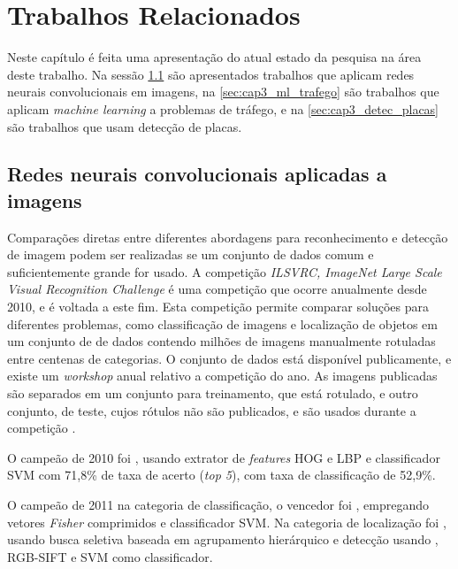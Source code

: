 
\chapter{Trabalhos Relacionados}

Neste capítulo é feita uma apresentação do atual estado da pesquisa na área
deste trabalho. Na sessão \ref{sec:cap3_img} são apresentados trabalhos que
aplicam redes neurais convolucionais em imagens, na \ref{sec:cap3_ml_trafego} 
são trabalhos que aplicam \emph{machine learning} a problemas de tráfego, e na
\ref{sec:cap3_detec_placas} são trabalhos que usam detecção de placas.

\section{Redes neurais convolucionais aplicadas a imagens} \label{sec:cap3_img}

Comparações diretas entre diferentes abordagens para reconhecimento e detecção de
imagem podem ser realizadas se um conjunto de dados comum e suficientemente
grande for usado. A competição \emph{ILSVRC, ImageNet Large Scale Visual
Recognition Challenge} é uma competição que ocorre anualmente desde 2010, e é
voltada a este fim. Esta competição permite comparar soluções 
para diferentes problemas, como classificação de imagens e localização de
objetos em um conjunto de
de dados contendo milhões de imagens manualmente rotuladas entre centenas de
categorias. O conjunto de dados está disponível publicamente, e existe um
\emph{workshop} anual relativo a competição do ano. As imagens publicadas são
separados em um conjunto para treinamento, que está rotulado, e outro
conjunto, de
teste, cujos rótulos não são publicados, e são usados durante a competição
 \cite{ILSVRC15}.

O campeão de 2010 foi , usando extrator de
\emph{features} HOG e LBP e classificador SVM com 71,8\% de taxa de
acerto (\emph{top 5}), com taxa de classificação de 52,9\%.

O campeão de 2011 na categoria de classificação, o vencedor foi
, empregando vetores
\emph{Fisher} comprimidos e classificador SVM. Na categoria de localização foi
, usando busca seletiva baseada em agrupamento
hierárquico e detecção usando , RGB-SIFT e SVM como classificador.


